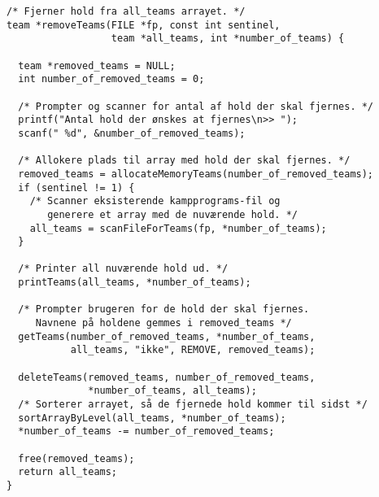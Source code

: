 \begin{verbatim}
/* Fjerner hold fra all_teams arrayet. */
team *removeTeams(FILE *fp, const int sentinel, 
                  team *all_teams, int *number_of_teams) {
                  
  team *removed_teams = NULL;
  int number_of_removed_teams = 0;

  /* Prompter og scanner for antal af hold der skal fjernes. */
  printf("Antal hold der ønskes at fjernes\n>> ");
  scanf(" %d", &number_of_removed_teams);

  /* Allokere plads til array med hold der skal fjernes. */
  removed_teams = allocateMemoryTeams(number_of_removed_teams);
  if (sentinel != 1) {
    /* Scanner eksisterende kampprograms-fil og 
       generere et array med de nuværende hold. */
    all_teams = scanFileForTeams(fp, *number_of_teams);
  }

  /* Printer all nuværende hold ud. */
  printTeams(all_teams, *number_of_teams);

  /* Prompter brugeren for de hold der skal fjernes. 
     Navnene på holdene gemmes i removed_teams */
  getTeams(number_of_removed_teams, *number_of_teams, 
           all_teams, "ikke", REMOVE, removed_teams);

  deleteTeams(removed_teams, number_of_removed_teams, 
              *number_of_teams, all_teams);
  /* Sorterer arrayet, så de fjernede hold kommer til sidst */
  sortArrayByLevel(all_teams, *number_of_teams);
  *number_of_teams -= number_of_removed_teams;

  free(removed_teams);
  return all_teams;
}
\end{verbatim}

